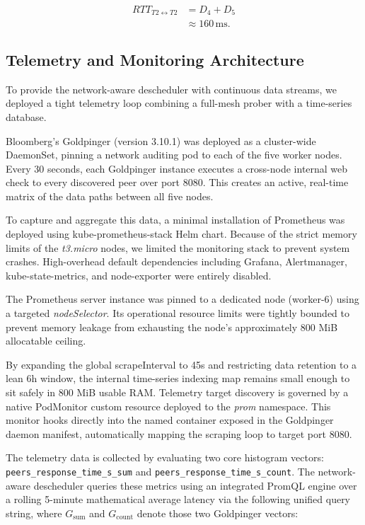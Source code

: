 \[
\begin{aligned}
RTT_{T2\leftrightarrow T2}
&=
D_4 + D_5\\
&\approx 160\,\text{ms}.
\end{aligned}
\]



\subsection{Telemetry and Monitoring Architecture}
\label{subsubsec:netaware4_monitoringsetup}

To provide the network-aware descheduler with continuous data streams, we deployed a tight telemetry loop combining a full-mesh prober with a time-series database.

Bloomberg's Goldpinger (version 3.10.1) was deployed as a cluster-wide DaemonSet, pinning a network auditing pod to each of the five worker nodes. Every 30 seconds, each Goldpinger instance executes a cross-node internal web check to every discovered peer over port 8080. This creates an active, real-time matrix of the data paths between all five nodes.

To capture and aggregate this data, a minimal installation of Prometheus was deployed using kube-prometheus-stack Helm chart. Because of the strict memory limits of the \textit{t3.micro} nodes, we limited the monitoring stack to prevent system crashes. High-overhead default dependencies including Grafana, Alertmanager, kube-state-metrics, and node-exporter were entirely disabled.

The Prometheus server instance was pinned to a dedicated node (worker-6) using a targeted \emph{nodeSelector}. Its operational resource limits were tightly bounded to prevent memory leakage from exhausting the node's approximately 800 MiB allocatable ceiling.

By expanding the global scrapeInterval to 45s and restricting data retention to a lean 6h window, the internal time-series indexing map remains small enough to sit safely in 800 MiB usable RAM. Telemetry target discovery is governed by a native PodMonitor custom resource deployed to the \emph{prom} namespace. This monitor hooks directly into the named container exposed in the Goldpinger daemon manifest, automatically mapping the scraping loop to target port 8080.

The telemetry data is collected by evaluating two core histogram vectors: \texttt{peers\_response\_time\_s\_sum} and \texttt{peers\_response\_time\_s\_count}. The network-aware descheduler queries these metrics using an integrated PromQL engine over a rolling 5-minute mathematical average latency via the following unified query string, where \(G_{\text{sum}}\) and \(G_{\text{count}}\) denote those two Goldpinger vectors:

